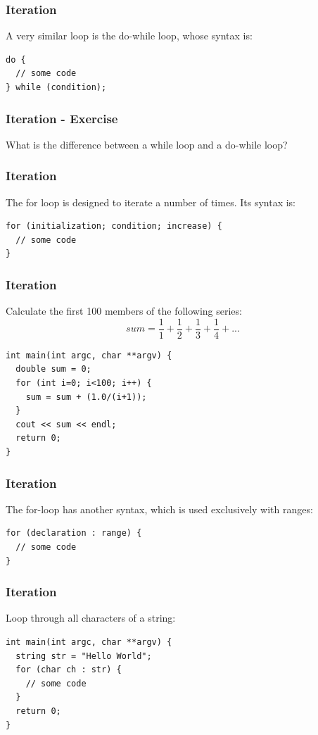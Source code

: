 \begin{frame}[fragile]
  \frametitle{Iteration}
  A very similar loop is the do-while loop, whose syntax is:
\begin{lstlisting}
do {
  // some code
} while (condition);
\end{lstlisting}
\end{frame}

\begin{frame}[fragile]
  \frametitle{Iteration - Exercise}
  \begin{exercise}
  What is the difference between a while loop and a do-while loop?
  \end{exercise}
\end{frame}

\begin{frame}[fragile]
  \frametitle{Iteration}
  The for loop is designed to iterate a number of times. Its syntax is:
\begin{lstlisting}
for (initialization; condition; increase) {
  // some code
}
\end{lstlisting}
\end{frame}

\begin{frame}[fragile]
\frametitle{Iteration}
Calculate the first 100 members of the following series:
\begin{displaymath}
sum = \frac{1}{1} + \frac{1}{2} + \frac{1}{3} + \frac{1}{4} + ...
\end{displaymath}
\begin{lstlisting}
int main(int argc, char **argv) {
  double sum = 0;
  for (int i=0; i<100; i++) {
    sum = sum + (1.0/(i+1));
  }
  cout << sum << endl;
  return 0;
}
\end{lstlisting}
\end{frame}

\begin{frame}[fragile]
\frametitle{Iteration}
The for-loop has another syntax, which is used exclusively with ranges:
\begin{lstlisting}
for (declaration : range) {
  // some code
}
\end{lstlisting}
\end{frame}

\begin{frame}[fragile]
\frametitle{Iteration}
Loop through all characters of a string:
\begin{lstlisting}
int main(int argc, char **argv) {
  string str = "Hello World";
  for (char ch : str) {
    // some code
  }
  return 0;
}
\end{lstlisting}
\end{frame}


